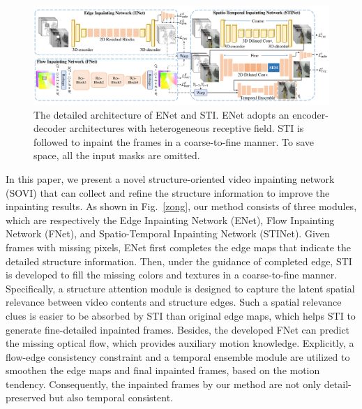 \begin{figure}[t]
	\centering
	\includegraphics[width=2.0\columnwidth]{sti} %
	\caption{The detailed architecture of ENet and STI. ENet adopts an encoder-decoder architectures with heterogeneous receptive field. STI is followed to inpaint the frames in a coarse-to-fine manner. To save space, all the input masks are omitted.}
	
	\label{fig:stiNet}
\end{figure}
In this paper, we present a novel structure-oriented video inpainting network (SOVI) that can collect and refine the structure information to improve the inpainting results. As shown in Fig.~\ref{zong}, our method consists of three modules, which are respectively the Edge Inpainting Network (ENet), Flow Inpainting Network (FNet), and Spatio-Temporal Inpainting Network (STINet).
Given frames with missing pixels, ENet first completes the edge maps that indicate the detailed structure information. Then, under the guidance of completed edge, STI is developed to fill the missing colors and textures in a coarse-to-fine manner.
Specifically, a structure attention module is designed to capture the latent spatial relevance between video contents and structure edges.
Such a spatial relevance clues is easier to be absorbed by STI than original edge maps, which helps STI to generate fine-detailed inpainted frames.
Besides, the developed FNet can predict the missing optical flow, which provides auxiliary motion knowledge. Explicitly, a flow-edge consistency constraint and a temporal ensemble module are utilized to smoothen the edge maps and final inpainted frames, based on the motion tendency. Consequently, the inpainted frames by our method are not only detail-preserved but also temporal consistent.

